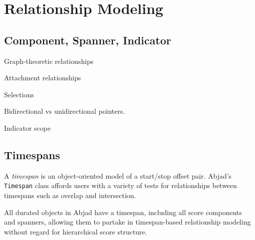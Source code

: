 \section{Relationship Modeling}\label{sec:relationship_modeling}

\subsection{Component, Spanner, Indicator}

Graph-theoretic relationships

Attachment relationships

Selections

Bidirectional vs unidirectional pointers.

Indicator scope

\subsection{Timespans}

A \emph{timespan} is an object-oriented model of a start/stop offset pair.
Abjad's \texttt{Timespan} class affords users with a variety of tests for
relationships between timespans such as overlap and intersection.

All durated objects in Abjad have a timespan, including all score components
and spanners, allowing them to partake in timespan-based relationship modeling
without regard for hierarchical score structure.